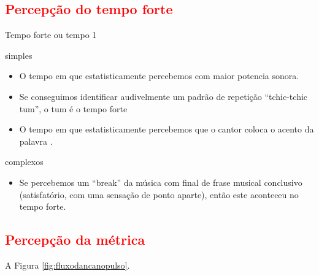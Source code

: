 \subsection{\textcolor{red}{Percepção do tempo forte}}
Tempo forte ou tempo 1

simples
\begin{itemize}
\item O tempo em que estatisticamente percebemos com maior potencia sonora. 
\item Se conseguimos identificar audivelmente um padrão de repetição ``tchic-tchic tum'', o tum é o tempo forte
\item O tempo em que estatisticamente percebemos que o cantor  coloca o acento da palavra \cite[pp. 149]{medteoria}. 
\end{itemize}

complexos 
\begin{itemize}
\item Se percebemos um ``break'' da música com final de frase musical conclusivo 
(satisfatório, com uma sensação de ponto aparte), então este aconteceu no tempo forte.
\end{itemize}


\subsection{\textcolor{red}{Percepção da métrica}}


A Figura \ref{fig:fluxodancanopulso}.

